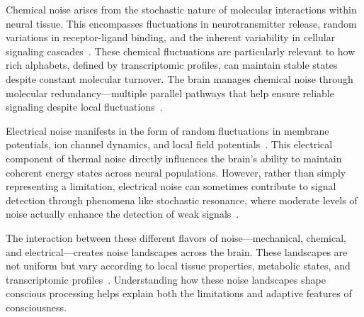 Chemical noise arises from the stochastic nature of molecular interactions within neural tissue. This encompasses fluctuations in neurotransmitter release, random variations in receptor-ligand binding, and the inherent variability in cellular signaling cascades~\cite{pellerin2004neuroenergetics}. These chemical fluctuations are particularly relevant to how rich alphabets, defined by transcriptomic profiles, can maintain stable states despite constant molecular turnover. The brain manages chemical noise through molecular redundancy—multiple parallel pathways that help ensure reliable signaling despite local fluctuations~\cite{siletti2023transcriptomic}.

Electrical noise manifests in the form of random fluctuations in membrane potentials, ion channel dynamics, and local field potentials~\cite{pinotsis2023vivo}. This electrical component of thermal noise directly influences the brain's ability to maintain coherent energy states across neural populations. However, rather than simply representing a limitation, electrical noise can sometimes contribute to signal detection through phenomena like stochastic resonance, where moderate levels of noise actually enhance the detection of weak signals~\cite{mcdonnell2011}.

The interaction between these different flavors of noise—mechanical, chemical, and electrical—creates noise landscapes across the brain. These landscapes are not uniform but vary according to local tissue properties, metabolic states, and transcriptomic profiles~\cite{bakken2021comparative}. Understanding how these noise landscapes shape conscious processing helps explain both the limitations and adaptive features of consciousness.

